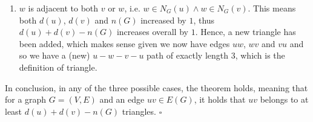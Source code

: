 \begin{enumerate}[a)]
\begin{enumerate}
        \item $w$ is adjacent to both $v$ or $w$, i.e. $w \in N_G(u) \wedge w \in N_G(v)$. This means both $d(u)$, $d(v)$ and $n(G)$ increased by $1$, thus $d(u)+d(v)-n(G)$ increases overall by $1$. Hence, a new triangle has been added, which makes sense given we now have edges $uw$, $wv$ and $vu$ and so we have a (new) $u-w-v-u$ path of exactly length 3, which is the definition of triangle.  
    \end{enumerate}
    In conclusion, in any of the three possible cases, the theorem holds, meaning that for a graph $G = (V,E)$ and an edge $uv \in E(G)$, it holds that $uv$ belongs to at least $d(u)+d(v)-n(G)$ triangles. \hspace{10mm}$\square$
\end{enumerate}